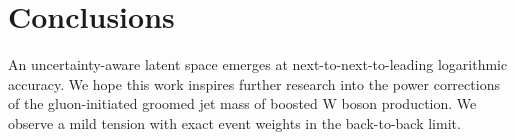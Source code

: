 \section{Conclusions}\label{sec:conclusions}

An uncertainty-aware latent space emerges at next-to-next-to-leading
logarithmic accuracy. We hope this work inspires further research into
the power corrections of the gluon-initiated groomed jet mass of boosted
W boson production. We observe a mild tension with exact event weights
in the back-to-back limit.

